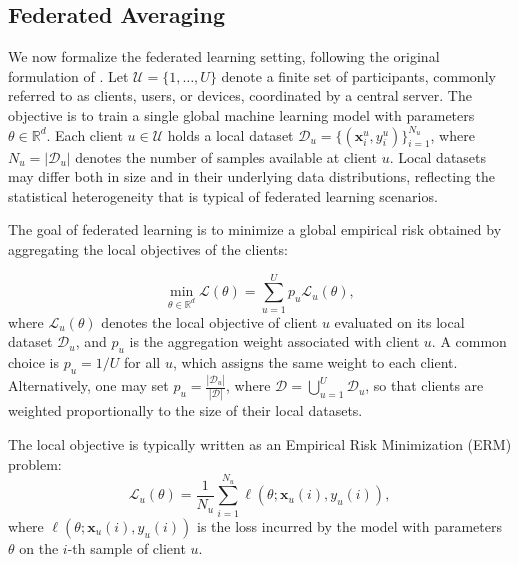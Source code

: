 \subsection{Federated Averaging}

We now formalize the federated learning setting, following the original formulation of . Let $\mathcal{U}=\{1,\dots,U\}$ denote a finite set of participants, commonly referred to as clients, users, or devices, coordinated by a central server. The objective is to train a single global machine learning model with parameters $\theta\in\mathbb{R}^d$. Each client $u\in\mathcal{U}$ holds a local dataset $\mathcal{D}_u=\{(\mathbf{x}_i^u, y_i^u)\}_{i=1}^{N_u}$, where $N_u = |\mathcal{D}_u|$ denotes the number of samples available at client $u$. Local datasets may differ both in size and in their underlying data distributions, reflecting the statistical heterogeneity that is typical of federated learning scenarios.

The goal of federated learning is to minimize a global empirical risk obtained by aggregating the local objectives of the clients:

\begin{equation}
\min_{\theta\in \mathbb{R}^d}
\mathcal{L}(\theta)
=
\sum_{u=1}^U p_u \mathcal{L}_u(\theta),
\end{equation}
where $\mathcal{L}_u(\theta)$ denotes the local objective of client $u$ evaluated on its local dataset $\mathcal{D}_u$, and $p_u$ is the aggregation weight associated with client $u$. A common choice is $p_u = 1/U$ for all $u$, which assigns the same weight to each client. Alternatively, one may set $p_u = \frac{|\mathcal{D}_u|}{|\mathcal{D}|}$, where
$\mathcal{D} = \bigcup_{u=1}^U \mathcal{D}_u$, so that clients are weighted proportionally to the size of their local datasets.

The local objective is typically written as an Empirical Risk Minimization (ERM) problem:
\begin{equation}
\mathcal{L}_u(\theta)
=
\frac{1}{N_u}
\sum_{i=1}^{N_u}
\ell(\theta;\mathbf{x}_u(i),y_u(i)),
\end{equation}
where $\ell(\theta;\mathbf{x}_u(i),y_u(i))$ is the loss incurred by the model with parameters $\theta$ on the $i$-th sample of client $u$.

